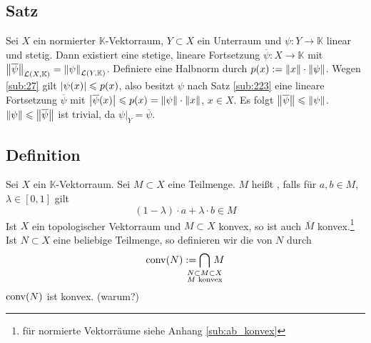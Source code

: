 \subsection[Satz (Hahn-Banach): Existenz einer stetigen linearen Fortsetzung]{Satz} %
\label{sub:224}
Sei $X$ ein normierter $\mathds{K}$-Vektorraum, $Y \subset X$ ein Unterraum und $\psi \colon Y \to \mathds{K}$ linear und stetig. Dann existiert eine stetige, lineare 
Fortsetzung $\overline{\psi} : X \to \mathds{K}$ mit $\norm[\mathcal{L}(X,\mathds{K})]{\overline{\psi}} = \norm[\mathcal{L}(Y,\mathds{K})]{\psi}$.
Definiere eine Halbnorm durch $p(x) := \norm{x} \cdot \norm{\psi}$. Wegen \ref{sub:27} gilt $\abs*{\psi(x)} \le p(x)$, also
besitzt $\psi$ nach Satz \ref{sub:223} eine lineare Fortsetzung $\overline{\psi}$ mit $\abs[\big]{\overline{\psi}(x)} \le p(x)= \norm{\psi} \cdot \norm{x}$, $x \in X$. 
Es folgt $\norm{\overline{\psi}} \le \norm{\psi}$. $\norm{\psi} \le \norm{\overline{\psi}}$ ist trivial, da $\psi|_{Y} = \overline{\psi}$. \bewende

\subsection[Definition: Konvexe Teilmenge eines $\mathds{K}$-Vektorraums, konvexe Hülle]{Definition} %
\label{sub:225}
Sei $X$ ein $\mathds{K}$-Vektorraum. Sei $M \subset X$ eine Teilmenge. $M$ heißt , falls für $a,b \in M$, $\lambda \in [0,1]$ gilt
\[
	(1-\lambda ) \cdot a + \lambda \cdot b \in M
\]
Ist $X$ ein topologischer Vektorraum und $M \subset X$ konvex, so ist auch $\overline{M}$ konvex.\footnote{für normierte Vektorräume siehe Anhang \ref{sub:ab_konvex}}
Ist $N \subset X$ eine beliebige Teilmenge, so definieren wir die  von $N$ durch  
\[
	\conv(N) := \smashoperator{\bigcap_{\substack{N \subset M \subset X \\ M \text{ konvex} }}} \, M
\]
$\conv(N)$ ist konvex. (warum?)

